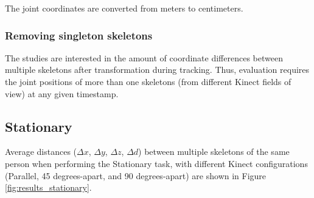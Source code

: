The joint coordinates are converted from meters to centimeters.

\subsubsection{Removing singleton skeletons}

The studies are interested in the amount of coordinate differences between multiple skeletons after transformation during tracking. Thus, evaluation requires the joint positions of more than one skeletons (from different Kinect fields of view) at any given timestamp. 

\subsection{Stationary}

Average distances ($\Delta x$, $\Delta y$, $\Delta z$, $\Delta d$) between multiple skeletons of the same person when performing the Stationary task, with different Kinect configurations (Parallel, 45 degrees-apart, and 90 degrees-apart) are shown in Figure \ref{fig:results_stationary}.


\begin{figure*}[h!]
  \centering

  
   \\
  
   \\
  
  

  \caption{Average distances ($\Delta x$, $\Delta y$, $\Delta z$, $\Delta d$) between multiple skeletons
    of the same person when performing the Stationary task, with different Kinect configurations
    (Parallel, 45 degrees-apart, and 90 degrees-apart). These figures show the changes in average distances
    with time, as well as the overall average distances for each joint type over time.}

  \label{fig:results_stationary}
\end{figure*}

